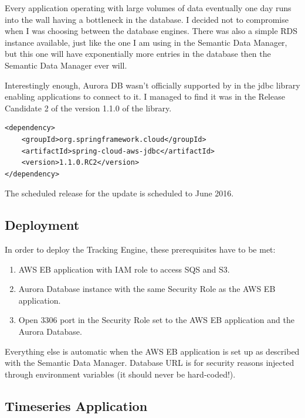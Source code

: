 \newpage

Every application operating with large volumes of data eventually one day runs into the wall having a bottleneck in the database. I decided not to compromise when I was choosing between the database engines. There was also a simple RDS instance available, just like the one I am using in the Semantic Data Manager, but this one will have exponentially more entries in the database then the Semantic Data Manager ever will.

Interestingly enough, Aurora DB wasn't officially supported by in the jdbc library enabling applications to connect to it. I managed to find it was in the Release Candidate 2 of the version 1.1.0 of the library. 

\bigbreak

\begin{lstlisting}
<dependency>
	<groupId>org.springframework.cloud</groupId>
	<artifactId>spring-cloud-aws-jdbc</artifactId>
	<version>1.1.0.RC2</version>
</dependency>
\end{lstlisting}

\bigbreak

The scheduled release for the update is scheduled to June 2016.

\subsection{Deployment}

In order to deploy the Tracking Engine, these prerequisites have to be met:

\begin{enumerate}
	\item AWS EB application with IAM role to access SQS and S3.
	\item Aurora Database instance with the same Security Role as the AWS EB application.
	\item Open 3306 port in the Security Role set to the AWS EB application and the Aurora Database.
\end{enumerate}

Everything else is automatic when the AWS EB application is set up as described with the Semantic Data Manager. Database URL is for security reasons injected through environment variables (it should never be hard-coded!).

\subsection{Timeseries Application}

